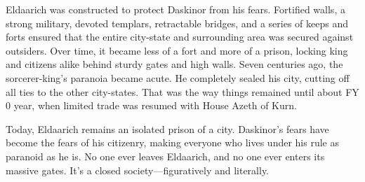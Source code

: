 {	Eldaarich was constructed to protect Daskinor from his fears. Fortified walls, a strong military, devoted templars, retractable bridges, and a series of keeps and forts ensured that the entire city-state and surrounding area was secured against outsiders. Over time, it became less of a fort and more of a prison, locking king and citizens alike behind sturdy gates and high walls. Seven centuries ago, the sorcerer-king's paranoia became acute. He completely sealed his city, cutting off all ties to the other city-states. That was the way things remained until about FY 0 year, when limited trade was resumed with House Azeth of Kurn.

	Today, Eldaarich remains an isolated prison of a city. Daskinor's fears have become the fears of his citizenry, making everyone who lives under his rule as paranoid as he is. No one ever leaves Eldaarich, and no one ever enters its massive gates. It's a closed society---figuratively and literally.
}
